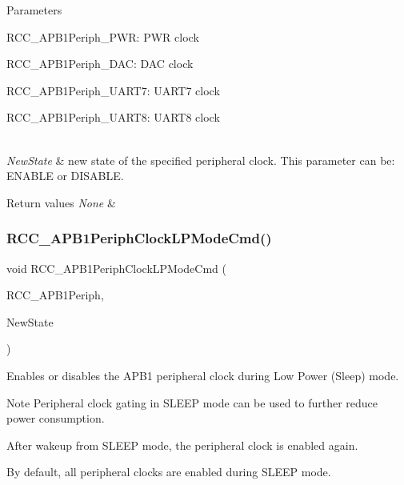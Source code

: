 \begin{DoxyParams}{Parameters}
\begin{DoxyItemize}
R\+C\+C\+\_\+\+A\+P\+B1\+Periph\+\_\+\+P\+WR\+: P\+WR clock \item R\+C\+C\+\_\+\+A\+P\+B1\+Periph\+\_\+\+D\+AC\+: D\+AC clock \item R\+C\+C\+\_\+\+A\+P\+B1\+Periph\+\_\+\+U\+A\+R\+T7\+: U\+A\+R\+T7 clock \item R\+C\+C\+\_\+\+A\+P\+B1\+Periph\+\_\+\+U\+A\+R\+T8\+: U\+A\+R\+T8 clock \end{DoxyItemize}
\\
\hline
{\em New\+State} & new state of the specified peripheral clock. This parameter can be\+: E\+N\+A\+B\+LE or D\+I\+S\+A\+B\+LE. \\
\hline
\end{DoxyParams}

\begin{DoxyRetVals}{Return values}
{\em None} & \\
\hline
\end{DoxyRetVals}
\mbox{\label{group___r_c_c_ga84dd64badb84768cbcf19e241cadff50}} 
\subsubsection{\texorpdfstring{R\+C\+C\+\_\+\+A\+P\+B1\+Periph\+Clock\+L\+P\+Mode\+Cmd()}{RCC\_APB1PeriphClockLPModeCmd()}}
{\footnotesize\ttfamily void R\+C\+C\+\_\+\+A\+P\+B1\+Periph\+Clock\+L\+P\+Mode\+Cmd (\begin{DoxyParamCaption}\item[{uint32\+\_\+t}]{R\+C\+C\+\_\+\+A\+P\+B1\+Periph,  }\item[{Functional\+State}]{New\+State }\end{DoxyParamCaption})}



Enables or disables the A\+P\+B1 peripheral clock during Low Power (Sleep) mode. 

\begin{DoxyNote}{Note}
Peripheral clock gating in S\+L\+E\+EP mode can be used to further reduce power consumption. 

After wakeup from S\+L\+E\+EP mode, the peripheral clock is enabled again. 

By default, all peripheral clocks are enabled during S\+L\+E\+EP mode. 
\end{DoxyNote}


